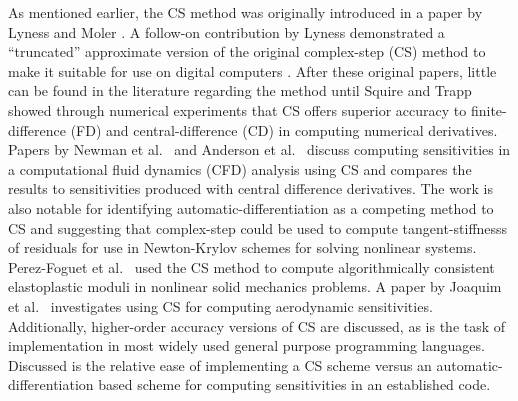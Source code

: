 \documentclass[preprint,12pt]{elsarticle}
\begin{document}
As mentioned earlier, the CS method was originally introduced in a paper by Lyness and Moler \cite{lyness1967numerical}.  A follow-on contribution by Lyness demonstrated a ``truncated'' approximate version of the original complex-step (CS) method to make it suitable for use on digital computers \cite{lyness1968differentiation}.  After these original papers, little can be found in the literature regarding the method until Squire and Trapp showed through numerical experiments that CS offers superior accuracy to finite-difference (FD) and central-difference (CD) \cite{squire1998using} in computing numerical derivatives. Papers by Newman et al.\ \cite{newman1998} and Anderson et al.\ \cite{anderson2001sensitivity} discuss computing sensitivities in a computational fluid dynamics (CFD) analysis using CS and compares the results to sensitivities produced with central difference derivatives. The work is also notable for identifying automatic-differentiation as a competing method to CS and suggesting that complex-step could be used to compute tangent-stiffnesss of residuals for use in Newton-Krylov schemes for solving nonlinear systems. Perez-Foguet et al.\ \cite{perez2000numerical, perez2012numerical} used the CS method to compute algorithmically consistent elastoplastic moduli in nonlinear solid mechanics problems.  A paper by Joaquim et al.\ \cite{martins2000automated} investigates using CS for computing aerodynamic sensitivities. Additionally, higher-order accuracy versions of CS are discussed, as is the task of implementation in most widely used general purpose programming languages. Discussed is the relative ease of implementing a CS scheme versus an automatic-differentiation based scheme for computing sensitivities in an established code.  
\end{document}
